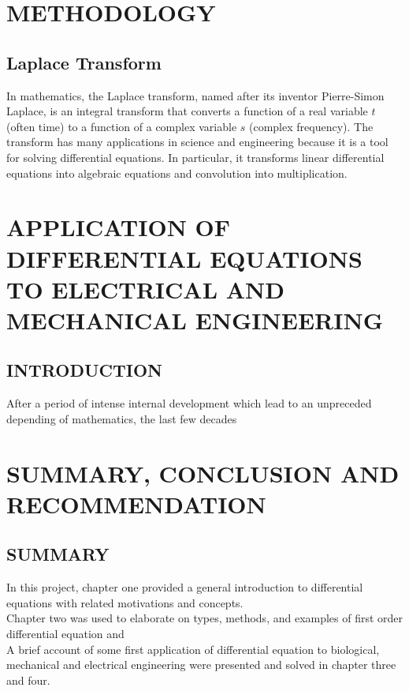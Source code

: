 \documentclass[11pt]{report}
\newcommand{\NI}{\noindent}
\begin{document}
	\chapter{METHODOLOGY}
	\section{Laplace Transform}
	In mathematics, the Laplace transform, named after its inventor Pierre-Simon Laplace, is an integral transform that converts a function of a real variable $t$ (often time) to a function of a complex variable $s$ (complex frequency). The transform has many applications in science and engineering because it is a tool for solving differential equations. In particular, it transforms linear differential equations into algebraic equations and convolution into multiplication.

	
	\chapter{APPLICATION OF DIFFERENTIAL EQUATIONS TO ELECTRICAL AND MECHANICAL ENGINEERING}
	\section{INTRODUCTION}
	After a period of intense internal development which lead to an unpreceded depending of mathematics, the last few decades 

	\chapter{SUMMARY, CONCLUSION AND RECOMMENDATION}
	\section{SUMMARY}
	In this project, chapter one provided a general introduction to differential equations with related motivations and concepts.\\
	
	\NI Chapter two was used to elaborate on types, methods, and examples of first order differential equation and\\
	
	\NI A brief account of some first application of differential equation to biological, mechanical and electrical engineering were presented and solved in chapter three and four.
	
\end{document}
